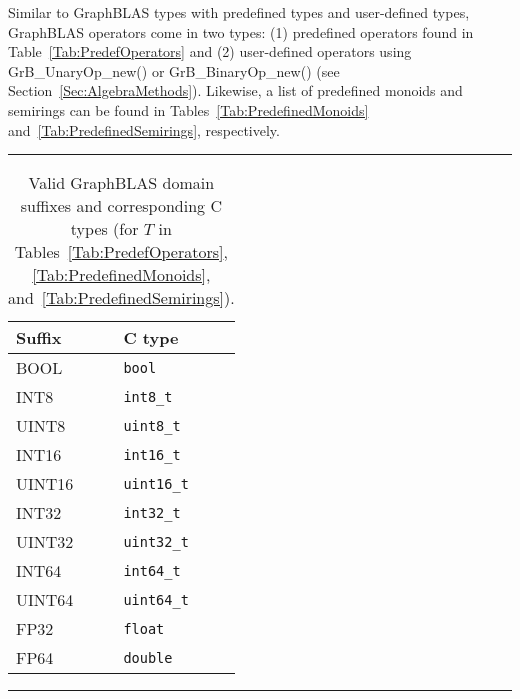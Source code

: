 Similar to GraphBLAS types with predefined types and user-defined types, 
GraphBLAS operators come in two types: (1) predefined operators 
found in Table~\ref{Tab:PredefOperators} and (2) user-defined operators 
using {\sf GrB\_UnaryOp\_new()} or {\sf GrB\_BinaryOp\_new()} (see 
Section~\ref{Sec:AlgebraMethods}).  Likewise, a list of predefined monoids and 
semirings can be found in Tables~\ref{Tab:PredefinedMonoids} 
and~\ref{Tab:PredefinedSemirings}, respectively.


\begin{table}
\hrule
\begin{center}
\caption{Valid GraphBLAS domain suffixes and corresponding C types (for $T$ in 
Tables~\ref{Tab:PredefOperators}, \ref{Tab:PredefinedMonoids}, 
and~\ref{Tab:PredefinedSemirings}).}
\label{Tab:PredefineDomains}

\vspace{1\baselineskip}

\begin{tabular}{l|l}
Suffix			& C type \\ \hline
{\sf BOOL}		& {\tt bool} \\
{\sf INT8}		& {\tt int8\_t} \\
{\sf UINT8}		& {\tt uint8\_t} \\
{\sf INT16}		& {\tt int16\_t} \\
{\sf UINT16}	& {\tt uint16\_t} \\
{\sf INT32}		& {\tt int32\_t} \\
{\sf UINT32}	& {\tt uint32\_t} \\
{\sf INT64}		& {\tt int64\_t} \\
{\sf UINT64}	& {\tt uint64\_t} \\
{\sf FP32}		& {\tt float} \\
{\sf FP64}		& {\tt double} \\
\end{tabular}
\end{center}
\hrule
\end{table}


